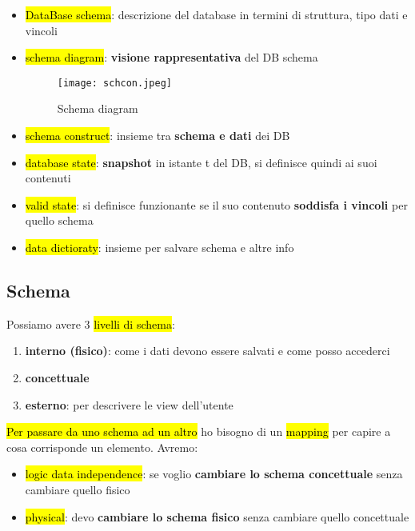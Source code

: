 \begin{itemize}
	\item \hl{DataBase schema}: descrizione del database in termini di struttura, tipo dati e vincoli
	
	\item \hl{schema diagram}: \textbf{visione rappresentativa} del DB schema
	
	
\begin{figure}[H]
\centering
\texttt{[image: schcon.jpeg]}
\caption{Schema diagram} 
\label{schcon}
\end{figure}
	
	
	\item \hl{schema construct}: insieme tra \textbf{schema e dati} dei DB


	\item \hl{database state}: \textbf{snapshot} in istante t del DB, si definisce quindi ai suoi contenuti
	
	\item \hl{valid state}: si definisce funzionante se il suo contenuto \textbf{soddisfa i vincoli} per quello schema
	
	\item \hl{data dictioraty}: insieme per salvare schema e altre info 
\end{itemize}


\subsection{Schema}

Possiamo avere 3 \hl{livelli di schema}:

\begin{enumerate}
	\item \textbf{interno (fisico)}: come i dati devono essere salvati e come posso accederci
	\item \textbf{concettuale}
	\item \textbf{esterno}: per descrivere le view dell'utente
\end{enumerate}


\hl{Per passare da uno schema ad un altro} ho bisogno di un \hl{mapping} per capire a cosa corrisponde un elemento. Avremo:

\begin{itemize}
	\item \hl{logic data independence}: se voglio \textbf{cambiare lo schema concettuale} senza cambiare quello fisico
	\item \hl{physical}: devo \textbf{cambiare lo schema fisico} senza cambiare quello concettuale
\end{itemize}


